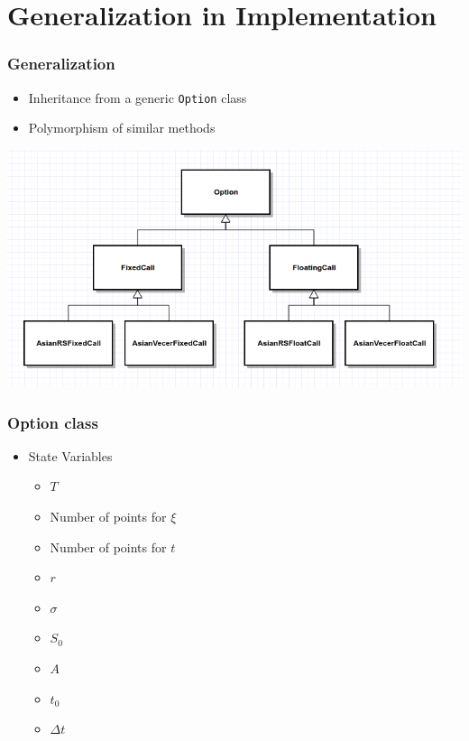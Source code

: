 \documentclass{beamer}
\begin{document}
  \section{Generalization in Implementation}
  \begin{frame}
    \frametitle{Generalization}
    \begin{itemize}
     \item Inheritance from a generic \texttt{Option} class
     \item Polymorphism of similar methods
    \end{itemize}
    \includegraphics[width=\textwidth]{class_diagram}
  \end{frame}

  \begin{frame}
    \frametitle{Option class}
    \begin{itemize}
      \item State Variables
      \begin{itemize}
        \item \(T\)
        \item Number of points for \(\xi\)
        \item Number of points for \(t\)
        \item \(r\)
        \item \(\sigma\)
        \item \(S_0\)
        \item \(A\)
        \item \(t_0\)
        \item \(\Delta t\)
      \end{itemize}
    \end{itemize}
  \end{frame}
\end{document}
